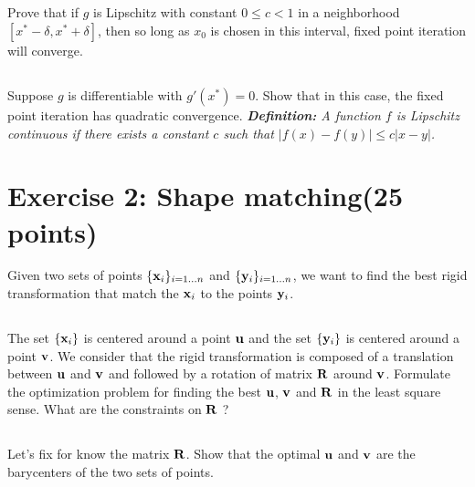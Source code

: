 \subsection{} Prove that if $g$ is Lipschitz with constant $0 \leq c < 1$ in a neighborhood $[x^* - \delta, x^* + \delta]$, then so long as $x_0$ is chosen in this interval, fixed point iteration will converge.

\subsection{} Suppose $g$ is differentiable with $g'(x^*) = 0$. Show that in this case, the fixed point iteration has quadratic convergence.\newline
\newline
\emph{\textbf{Definition:} A function $f$ is Lipschitz continuous if there exists a constant $c$ such that $|f(x) - f(y)| \leq c|x - y|$.} 

\begin{correction}
\end{correction}


\section*{Exercise 2: Shape matching\normalsize \textnormal(25 points)}

Given two sets of points $\{{\bf x}_i\}_{i = 1\hdots n}$ and $\{{\bf y}_i\}_{i = 1\hdots n}$, we want to find the best rigid transformation that match the ${\bf x}_i$ to the points ${\bf y}_i$. %

\subsection{} The set $\{{\bf x}_i\}$ is centered around a point ${\bf u}$ and the set $\{{\bf y}_i\}$ is centered around a point ${\bf v}$. We consider that the rigid transformation is composed of a translation between ${\bf u}$ and ${\bf v}$ and followed by a rotation of matrix ${\bf R}$ around ${\bf v}$.
Formulate the optimization problem for finding the best ${\bf u}$, ${\bf v}$ and ${\bf R}$ in the least square sense. What are the constraints on ${\bf R}$ ?

\subsection{} Let's fix for know the matrix ${\bf R}$. Show that the optimal ${\bf u}$ and ${\bf v}$ are the barycenters of the two sets of points.

